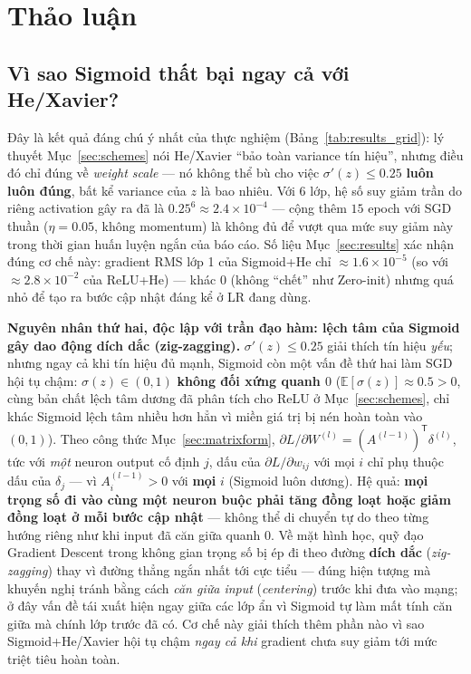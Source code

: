 \documentclass[12pt,a4paper]{report}
\newcommand{\en}[1]{\textit{#1}}
\newcommand{\T}{^{\mathsf{T}}}
\begin{document}
\section{Thảo luận}
\label{sec:discussion}

\subsection{Vì sao Sigmoid thất bại ngay cả với He/Xavier?}

Đây là kết quả
đáng chú ý nhất của thực nghiệm (Bảng~\ref{tab:results_grid}): lý thuyết
Mục~\ref{sec:schemes} nói He/Xavier ``bảo toàn variance tín hiệu'', nhưng
điều đó chỉ đúng về \emph{weight scale} --- nó không thể bù cho việc
$\sigma'(z)\le0.25$ \textbf{luôn luôn đúng}, bất kể variance của $z$ là
bao nhiêu. Với 6 lớp, hệ số suy giảm trần do riêng activation gây ra đã là
$0.25^6\approx2.4\times10^{-4}$ --- cộng thêm $15$ epoch với SGD thuần
($\eta=0.05$, không momentum) là không đủ để vượt qua mức suy giảm này
trong thời gian huấn luyện ngắn của báo cáo. Số liệu Mục~\ref{sec:results}
xác nhận đúng cơ chế này: gradient RMS lớp 1 của Sigmoid+He chỉ
$\approx1.6\times10^{-5}$ (so với $\approx2.8\times10^{-2}$ của
ReLU+He) --- khác $0$ (không ``chết'' như Zero-init) nhưng quá nhỏ để tạo ra
bước cập nhật đáng kể ở LR đang dùng.

\textbf{Nguyên nhân thứ hai, độc lập với trần đạo hàm: lệch tâm của
Sigmoid gây dao động dích dắc (zig-zagging).} $\sigma'(z)\le0.25$ giải
thích tín hiệu \emph{yếu}; nhưng ngay cả khi tín hiệu đủ mạnh, Sigmoid còn
một vấn đề thứ hai làm SGD hội tụ chậm: $\sigma(z)\in(0,1)$
\textbf{không đối xứng quanh $0$} ($\mathbb E[\sigma(z)]\approx0.5>0$,
cùng bản chất lệch tâm dương đã phân tích cho ReLU ở Mục~\ref{sec:schemes},
chỉ khác Sigmoid lệch tâm nhiều hơn hẳn vì miền giá trị bị nén hoàn toàn
vào $(0,1)$). Theo công thức Mục~\ref{sec:matrixform},
$\partial L/\partial W^{(l)}=(A^{(l-1)})\T\delta^{(l)}$, tức với \emph{một}
neuron output cố định $j$, dấu của $\partial L/\partial w_{ij}$ với mọi
$i$ chỉ phụ thuộc dấu của $\delta_j$ --- vì $A^{(l-1)}_{i}>0$ với
\textbf{mọi} $i$ (Sigmoid luôn dương). Hệ quả: \textbf{mọi trọng số đi vào
cùng một neuron buộc phải tăng đồng loạt hoặc giảm đồng loạt ở mỗi bước
cập nhật} --- không thể di chuyển tự do theo từng hướng riêng như khi input
đã căn giữa quanh $0$. Về mặt hình học, quỹ đạo Gradient Descent trong
không gian trọng số bị ép đi theo đường \textbf{dích dắc}
(\en{zig-zagging}) thay vì đường thẳng ngắn nhất tới cực tiểu --- đúng
hiện tượng mà \citet{lecun1998efficient} khuyến nghị tránh bằng cách
\emph{căn giữa input} (\en{centering}) trước khi đưa vào mạng; ở đây vấn
đề tái xuất hiện ngay giữa các lớp ẩn vì Sigmoid tự làm mất tính căn giữa
mà chính lớp trước đã có. Cơ chế này giải thích thêm phần nào vì sao
Sigmoid+He/Xavier hội tụ chậm \emph{ngay cả khi} gradient chưa suy giảm
tới mức triệt tiêu hoàn toàn.
\end{document}
